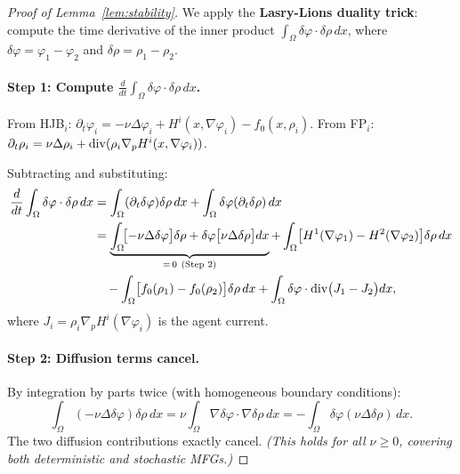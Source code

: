 \begin{proof}[Proof of Lemma~\ref{lem:stability}]
We apply the \textbf{Lasry-Lions duality trick}: compute the time
derivative of the inner product $\int_\Omega \delta\varphi\cdot\delta\rho\, dx$,
where $\delta\varphi = \varphi_1 - \varphi_2$ and $\delta\rho = \rho_1 - \rho_2$.

\paragraph{Step 1: Compute $\tfrac{d}{dt}\int_\Omega \delta\varphi\cdot\delta\rho\, dx$.}
From HJB$_i$: $\partial_t \varphi_i = -\nu\Delta\varphi_i + H^i(x,\nabla\varphi_i) - f_0(x,\rho_i)$.
From FP$_i$: $\partial_t\rho_i = \nu\Delta\rho_i + \operatorname{div}(\rho_i\nabla_p H^i(x,\nabla\varphi_i))$.

Subtracting and substituting:
\begin{align}
  \frac{d}{dt}\int_\Omega \delta\varphi\cdot\delta\rho\, dx
  &= \int_\Omega (\partial_t\delta\varphi)\delta\rho\, dx
   + \int_\Omega \delta\varphi(\partial_t\delta\rho)\, dx \notag\\
  &= \underbrace{\int_\Omega \!\bigl[-\nu\Delta\delta\varphi\bigr]\delta\rho
      + \delta\varphi\bigl[\nu\Delta\delta\rho\bigr]dx}_{=\,0\ (\text{Step 2})}
  + \int_\Omega \bigl[H^1(\nabla\varphi_1) - H^2(\nabla\varphi_2)\bigr]\delta\rho\, dx
  \notag\\
  &\quad
  - \int_\Omega \bigl[f_0(\rho_1) - f_0(\rho_2)\bigr]\delta\rho\, dx
  + \int_\Omega \delta\varphi\cdot\Div\bigl(J_1 - J_2\bigr)dx,
  \label{eq:ddt}
\end{align}
where $J_i = \rho_i\nabla_p H^i(\nabla\varphi_i)$ is the agent current.

\paragraph{Step 2: Diffusion terms cancel.}
By integration by parts twice (with homogeneous boundary conditions):
\[
  \int_\Omega (-\nu\Delta\delta\varphi)\delta\rho\, dx
  = \nu\int_\Omega \nabla\delta\varphi\cdot\nabla\delta\rho\, dx
  = -\int_\Omega \delta\varphi(\nu\Delta\delta\rho)\, dx.
\]
The two diffusion contributions exactly cancel.
\textit{(This holds for all $\nu \geq 0$, covering both deterministic and stochastic MFGs.)}


\end{proof}
